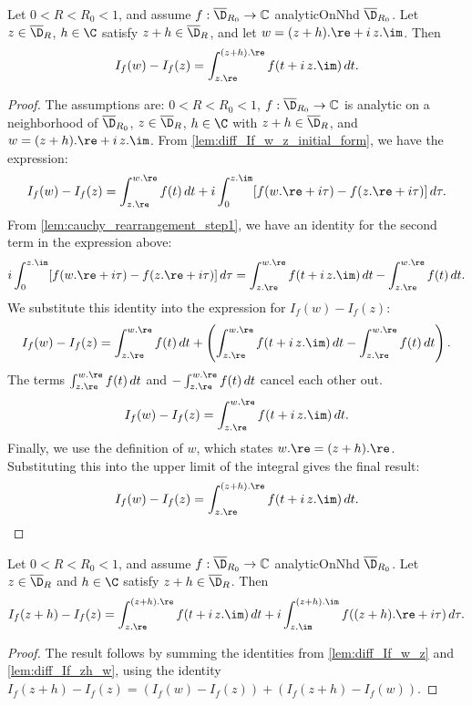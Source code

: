 \begin{lemma}\label{lem:diff_If_w_z}
\leanok
Let $0<R<R_0<1$, and assume $f:\overline{\D}_{R_0}\to\mathbb{C}$ analyticOnNhd $\overline{\D}_{R_0}$. Let $z \in \overline{\D}_R$, $h\in\C$ satisfy $z+h \in \overline{\D}_R$, and let $w = (z+h).\re + i\,z.\im$. Then
\[ I_f(w) - I_f(z) = \int_{z.\re}^{(z+h).\re} f(t + i\,z.\im)\,dt. \]
\end{lemma}
\begin{proof}
\leanok
{}
The assumptions are: $0<R<R_0<1$, $f:\overline{\D}_{R_0}\to\mathbb{C}$ is analytic on a neighborhood of $\overline{\D}_{R_0}$, $z \in \overline{\D}_R$, $h\in\C$ with $z+h \in \overline{\D}_R$, and $w = (z+h).\re + i\,z.\im$.
From \cref{lem:diff_If_w_z_initial_form}, we have the expression:
\[ I_f(w) - I_f(z) = \int_{z.\re}^{w.\re} f(t)\,dt + i \int_0^{z.\im} [f(w.\re + i\tau) - f(z.\re + i\tau)]\,d\tau. \]
From \cref{lem:cauchy_rearrangement_step1}, we have an identity for the second term in the expression above:
\[ i \int_0^{z.\im} [f(w.\re + i\tau) - f(z.\re + i\tau)]\,d\tau = \int_{z.\re}^{w.\re} f(t + i\,z.\im)\,dt - \int_{z.\re}^{w.\re} f(t)\,dt. \]
We substitute this identity into the expression for $I_f(w) - I_f(z)$:
\[ I_f(w) - I_f(z) = \int_{z.\re}^{w.\re} f(t)\,dt + \left( \int_{z.\re}^{w.\re} f(t + i\,z.\im)\,dt - \int_{z.\re}^{w.\re} f(t)\,dt \right). \]
The terms $\int_{z.\re}^{w.\re} f(t)\,dt$ and $-\int_{z.\re}^{w.\re} f(t)\,dt$ cancel each other out.
\[ I_f(w) - I_f(z) = \int_{z.\re}^{w.\re} f(t + i\,z.\im)\,dt. \]
Finally, we use the definition of $w$, which states $w.\re = (z+h).\re$. Substituting this into the upper limit of the integral gives the final result:
\[ I_f(w) - I_f(z) = \int_{z.\re}^{(z+h).\re} f(t + i\,z.\im)\,dt. \]
\end{proof}

\begin{lemma}[L path]\label{lem:If_difference_is_L_path_integral}
\leanok
Let $0<R<R_0<1$, and assume $f:\overline{\D}_{R_0}\to\mathbb{C}$ analyticOnNhd $\overline{\D}_{R_0}$. Let $z \in \overline{\D}_R$ and $h\in\C$ satisfy $z+h \in \overline{\D}_R$. Then
\[ I_f(z+h)-I_f(z) = \int_{z.\re}^{(z+h).\re} f(t + i\,z.\im)\,dt + i \int_{z.\im}^{(z+h).\im} f((z+h).\re + i\tau)\,d\tau. \]
\end{lemma}
\begin{proof}
\leanok
The result follows by summing the identities from \cref{lem:diff_If_w_z} and \cref{lem:diff_If_zh_w}, using the identity $I_f(z+h)-I_f(z) = (I_f(w) - I_f(z)) + (I_f(z+h) - I_f(w))$.
\end{proof}

